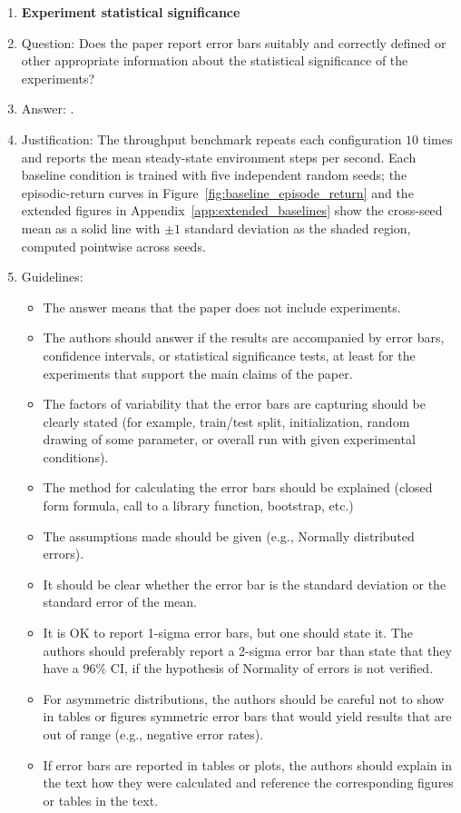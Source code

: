 \begin{enumerate}
\item {\bf Experiment statistical significance}
    \item[] Question: Does the paper report error bars suitably and correctly defined or other appropriate information about the statistical significance of the experiments?
    \item[] Answer: \answerYes{}.
    \item[] Justification: The throughput benchmark repeats each configuration $10$ times and reports the mean steady-state environment steps per second. Each baseline condition is trained with five independent random seeds; the episodic-return curves in Figure~\ref{fig:baseline_episode_return} and the extended figures in Appendix~\ref{app:extended_baselines} show the cross-seed mean as a solid line with $\pm 1$ standard deviation as the shaded region, computed pointwise across seeds.
    \item[] Guidelines:
    \begin{itemize}
        \item The answer \answerNA{} means that the paper does not include experiments.
        \item The authors should answer \answerYes{} if the results are accompanied by error bars, confidence intervals, or statistical significance tests, at least for the experiments that support the main claims of the paper.
        \item The factors of variability that the error bars are capturing should be clearly stated (for example, train/test split, initialization, random drawing of some parameter, or overall run with given experimental conditions).
        \item The method for calculating the error bars should be explained (closed form formula, call to a library function, bootstrap, etc.)
        \item The assumptions made should be given (e.g., Normally distributed errors).
        \item It should be clear whether the error bar is the standard deviation or the standard error of the mean.
        \item It is OK to report 1-sigma error bars, but one should state it. The authors should preferably report a 2-sigma error bar than state that they have a 96\% CI, if the hypothesis of Normality of errors is not verified.
        \item For asymmetric distributions, the authors should be careful not to show in tables or figures symmetric error bars that would yield results that are out of range (e.g., negative error rates).
        \item If error bars are reported in tables or plots, the authors should explain in the text how they were calculated and reference the corresponding figures or tables in the text.
    \end{itemize}


\end{enumerate}
